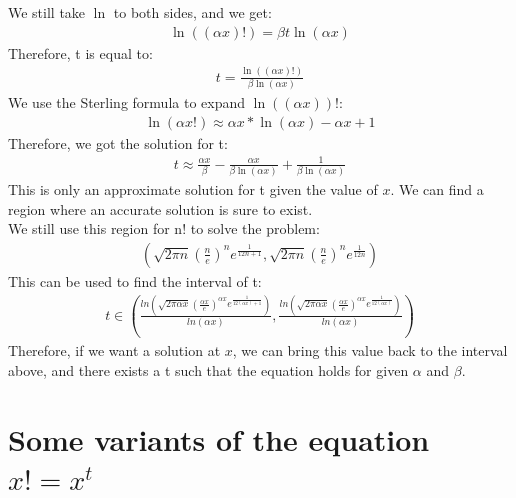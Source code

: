 \documentclass{article}
\begin{document}
        We still take $\ln$ to both sides, and we get:
            \begin{align*}
               \ln((\alpha x)!) = \beta t\ln(\alpha x)
            \end{align*}
        Therefore, t is equal to:
            \begin{align*}
               t = \frac{\ln((\alpha x)!)}{\beta \ln(\alpha x)}
            \end{align*}
        We use the Sterling formula to expand $\ln((\alpha x))!$:
            \begin{align*}
                \ln(\alpha x!) \approx \alpha x * \ln(\alpha x) - \alpha x + 1
            \end{align*}
        Therefore, we got the solution for t:
            \begin{align*}
                t \approx \frac{\alpha x}{\beta} - \frac{\alpha x}{\beta \ln(\alpha x)} + \frac{1}{\beta \ln(\alpha x)}
            \end{align*}
        This is only an approximate solution for t given the value of $x$. We can find a region where an accurate solution is sure to exist.\\

        We still use this region for n! to solve the problem:
            \begin{align*}
                (\sqrt{2\pi n} (\frac{n}{e})^n e^{\frac{1}{12n+1}},\sqrt{2\pi n} (\frac{n}{e})^n e^{\frac{1}{12n}})
            \end{align*}
        This can be used to find the interval of t:
            \begin{align*}
               t \in (\frac{ln(\sqrt{2\pi \alpha x} (\frac{\alpha x}{e})^{\alpha x} e^{\frac{1}{12(\alpha x)+1}})}{ln(\alpha x)},\frac{ln(\sqrt{2\pi \alpha x} (\frac{\alpha x}{e})^{\alpha x} e^{\frac{1}{12(\alpha x)}})}{ln(\alpha x)})
            \end{align*}
        Therefore, if we want a solution at $x$, we can bring this value back to the interval above, and there exists a t such that the equation holds for given $\alpha$ and $\beta$. 

        \section{Some variants of the equation $x! = x ^ {t}$}
\end{document}
